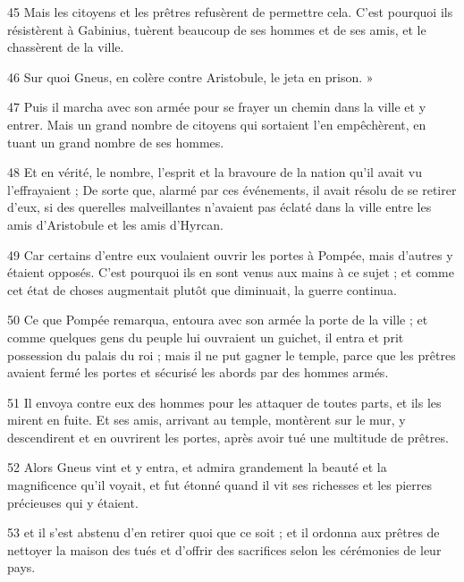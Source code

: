 \par 45 Mais les citoyens et les prêtres refusèrent de permettre cela. C'est pourquoi ils résistèrent à Gabinius, tuèrent beaucoup de ses hommes et de ses amis, et le chassèrent de la ville.

\par 46 Sur quoi Gneus, en colère contre Aristobule, le jeta en prison. »

\par 47 Puis il marcha avec son armée pour se frayer un chemin dans la ville et y entrer. Mais un grand nombre de citoyens qui sortaient l'en empêchèrent, en tuant un grand nombre de ses hommes.

\par 48 Et en vérité, le nombre, l'esprit et la bravoure de la nation qu'il avait vu l'effrayaient ; De sorte que, alarmé par ces événements, il avait résolu de se retirer d'eux, si des querelles malveillantes n'avaient pas éclaté dans la ville entre les amis d'Aristobule et les amis d'Hyrcan.

\par 49 Car certains d'entre eux voulaient ouvrir les portes à Pompée, mais d'autres y étaient opposés. C’est pourquoi ils en sont venus aux mains à ce sujet ; et comme cet état de choses augmentait plutôt que diminuait, la guerre continua.

\par 50 Ce que Pompée remarqua, entoura avec son armée la porte de la ville ; et comme quelques gens du peuple lui ouvraient un guichet, il entra et prit possession du palais du roi ; mais il ne put gagner le temple, parce que les prêtres avaient fermé les portes et sécurisé les abords par des hommes armés.

\par 51 Il envoya contre eux des hommes pour les attaquer de toutes parts, et ils les mirent en fuite. Et ses amis, arrivant au temple, montèrent sur le mur, y descendirent et en ouvrirent les portes, après avoir tué une multitude de prêtres.

\par 52 Alors Gneus vint et y entra, et admira grandement la beauté et la magnificence qu'il voyait, et fut étonné quand il vit ses richesses et les pierres précieuses qui y étaient.

\par 53 et il s'est abstenu d'en retirer quoi que ce soit ; et il ordonna aux prêtres de nettoyer la maison des tués et d'offrir des sacrifices selon les cérémonies de leur pays.

